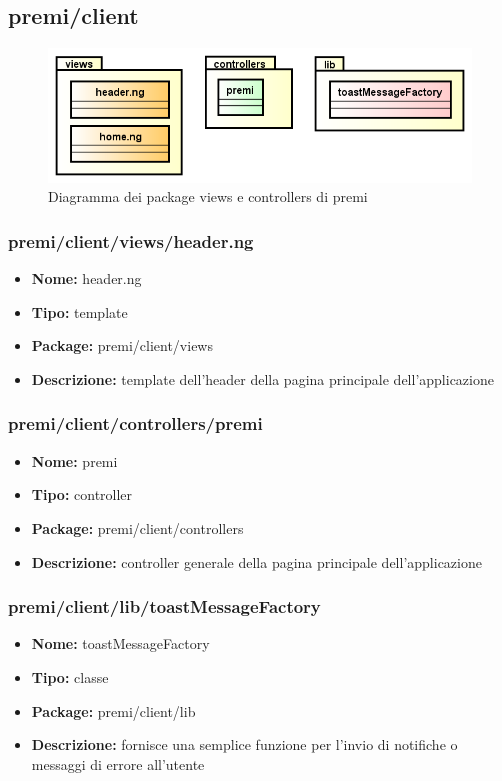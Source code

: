 \subsection{premi/client}
\begin{figure}[h]
\begin{center}
\includegraphics[scale=0.45]{img/diapkg/client.png}
\caption{Diagramma dei package views e controllers di premi}
\end{center}
\end{figure}

\subsubsection{premi/client/views/header.ng}
\begin{itemize}
  \item[] \textbf{Nome:} header.ng
  \item[] \textbf{Tipo:} template
  \item[] \textbf{Package:} premi/client/views
  \item[] \textbf{Descrizione:} template dell'header della pagina principale dell'applicazione
\end{itemize}

\subsubsection{premi/client/controllers/premi}
\begin{itemize}
  \item[] \textbf{Nome:} premi
  \item[] \textbf{Tipo:} controller
  \item[] \textbf{Package:} premi/client/controllers
  \item[] \textbf{Descrizione:} controller generale della pagina principale dell'applicazione
\end{itemize}

\subsubsection{premi/client/lib/toastMessageFactory}
\begin{itemize}
  \item[] \textbf{Nome:} toastMessageFactory
  \item[] \textbf{Tipo:} classe
  \item[] \textbf{Package:} premi/client/lib
  \item[] \textbf{Descrizione:} fornisce una semplice funzione per l'invio di notifiche o messaggi di errore all'utente
\end{itemize}


